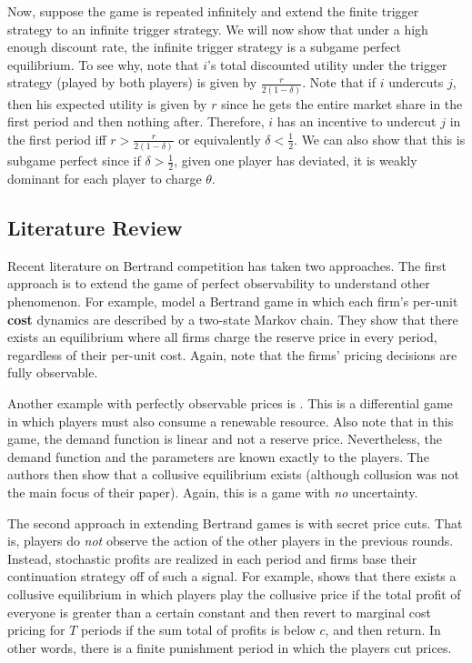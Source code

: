 \documentclass{article}
\begin{document}
Now, suppose the game is repeated infinitely and extend the finite
trigger strategy to an infinite trigger strategy.  We will now show
that under a high enough discount rate, the infinite trigger strategy
is a subgame perfect equilibrium.  To see why, note that $i$'s total
discounted utility under the trigger strategy (played by both players)
is given by $\frac{r}{2(1-\delta)}$.  Note that if $i$ undercuts $j$,
then his expected utility is given by $r$ since he gets the entire
market share in the first period and then nothing after.  Therefore,
$i$ has an incentive to undercut $j$ in the first period iff
$r>\frac{r}{2(1-\delta)}$ or equivalently $\delta<\frac{1}{2}$.  We
can also show that this is subgame perfect since if
$\delta>\frac{1}{2}$, given one player has deviated, it is weakly
dominant for each player to charge $\theta$. 

\subsection{Literature Review}
Recent literature on Bertrand competition has taken two
approaches.  The first approach is to extend the game of perfect
observability  to understand other
phenomenon.  For example, \cite{AB} model a Bertrand game in which
each firm's per-unit \textbf{cost} dynamics are described by a two-state Markov
chain.  They show that there exists an equilibrium  where all
firms charge the reserve price in every period, regardless of their
per-unit cost.  Again, note that the firms' pricing decisions are
fully observable.

Another example with perfectly observable prices is
\cite{differentialresource}.  This is a differential game in
which players must also consume a renewable resource.  Also note that
in this game, the demand function is linear and not a reserve price.
Nevertheless, the demand function and the parameters are known exactly
to the players.  The authors then show that a collusive equilibrium
exists (although collusion was not the main focus of their paper).
Again, this is a game with \emph{no} uncertainty.

The second approach in extending Bertrand games is with secret price
cuts.  That is, players do \emph{not} observe the action of the other
players in the previous rounds.  Instead,  stochastic
profits are realized in each period and firms base their continuation strategy off of
such a signal.  For example, \cite{greenold} shows that there exists a
collusive equilibrium in which players play the collusive price if the
total profit of everyone is greater than a certain constant and then
revert to marginal cost pricing for $T$ periods if the sum total
of profits is below $c$, and then return.  In other words, there is a
finite punishment period in which the players cut prices.  
\end{document}

